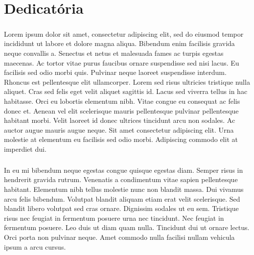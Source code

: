 \chapter{Dedicatória}

\paragraph{}
Lorem ipsum dolor sit amet, consectetur adipiscing elit, sed do eiusmod tempor incididunt ut labore et dolore magna aliqua. Bibendum enim facilisis gravida neque convallis a. Senectus et netus et malesuada fames ac turpis egestas maecenas. Ac tortor vitae purus faucibus ornare suspendisse sed nisi lacus. Eu facilisis sed odio morbi quis. Pulvinar neque laoreet suspendisse interdum. Rhoncus est pellentesque elit ullamcorper. Lorem sed risus ultricies tristique nulla aliquet. Cras sed felis eget velit aliquet sagittis id. Lacus sed viverra tellus in hac habitasse. Orci eu lobortis elementum nibh. Vitae congue eu consequat ac felis donec et. Aenean vel elit scelerisque mauris pellentesque pulvinar pellentesque habitant morbi. Velit laoreet id donec ultrices tincidunt arcu non sodales. Ac auctor augue mauris augue neque. Sit amet consectetur adipiscing elit. Urna molestie at elementum eu facilisis sed odio morbi. Adipiscing commodo elit at imperdiet dui.

\paragraph{}
In eu mi bibendum neque egestas congue quisque egestas diam. Semper risus in hendrerit gravida rutrum. Venenatis a condimentum vitae sapien pellentesque habitant. Elementum nibh tellus molestie nunc non blandit massa. Dui vivamus arcu felis bibendum. Volutpat blandit aliquam etiam erat velit scelerisque. Sed blandit libero volutpat sed cras ornare. Dignissim sodales ut eu sem. Tristique risus nec feugiat in fermentum posuere urna nec tincidunt. Nec feugiat in fermentum posuere. Leo duis ut diam quam nulla. Tincidunt dui ut ornare lectus. Orci porta non pulvinar neque. Amet commodo nulla facilisi nullam vehicula ipsum a arcu cursus.